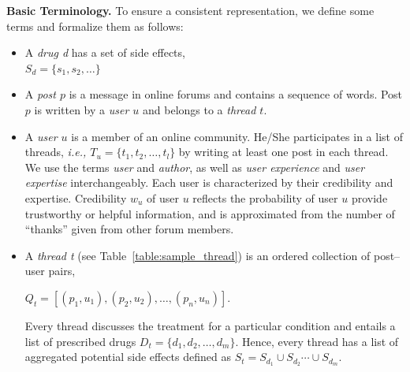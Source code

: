 \documentclass{bmcart}
\begin{document}
{\bf Basic Terminology.} To ensure a consistent representation, 
we define some terms and formalize them as follows:

\begin{itemize}
\item A \textit{drug d} has a set of side effects, \\
  $S_d = \{s_1, s_2, \ldots\}$
\item A \textit{post $p$} is a message in online forums and contains a sequence of words. Post $p$ is written by a \textit{user $u$} and belongs to a \textit{thread $t$}.
\item A \textit{user $u$} is a member of an online community. He/She participates in a list of threads, \textit{ i.e., $T_u = \{t_1, t_2, \ldots, t_l\}$} by writing at least one post in each thread.
We use the terms \textit{user} and \textit{author}, as well as \textit{user experience} and \textit{user expertise} interchangeably.
\noindent
Each user is characterized by their credibility and expertise. Credibility $w_u$ of user $u$ reflects the probability of user $u$ provide trustworthy or helpful information, and is approximated from the number of ``thanks'' given from other forum members.

\item A \textit{thread t}
(see Table~\ref{table:sample_thread}) 
is an ordered collection of post--user pairs, 

$Q_t = [\left(p_1, u_1\right), \left(p_2, u_2\right), \ldots, \left(p_n, u_n\right)]$. 

\noindent
Every thread discusses the treatment for a particular condition and entails a list of prescribed drugs 
$D_t=\{d_1, d_2, \ldots, d_m\}$. 
Hence, every thread has a list of aggregated potential side effects defined as $S_t = S_{d_1} \cup S_{d_2} \cdots \cup S_{d_m}$. \\

\end{itemize}
\end{document}
